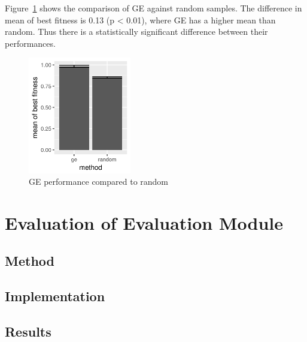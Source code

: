Figure~\ref{fig:ge-random} shows the comparison of GE against random samples.
The difference in mean of best fitness is 0.13 (p < 0.01), where GE has a higher mean than random.
Thus there is a statistically significant difference between their performances.

\begin{figure}
    \centering
    \includegraphics[width=0.4\textwidth]{figures/ge-random}
    \caption{GE performance compared to random}
    \label{fig:ge-random}
\end{figure}

\section{Evaluation of Evaluation Module}
\subsection{Method}
\subsection{Implementation}
\subsection{Results}
